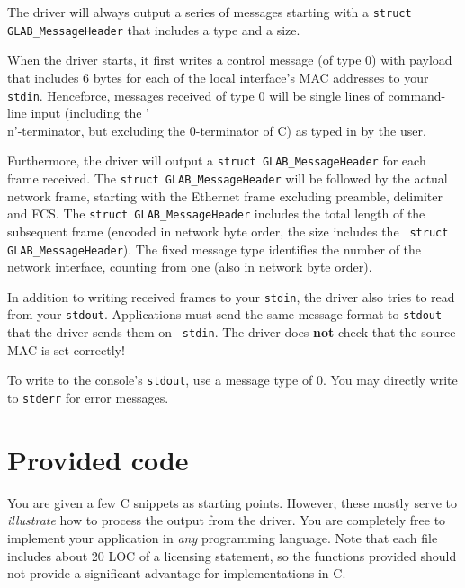 \documentclass{article}
\begin{document}
The driver will always output a series of messages starting with
a {\tt struct GLAB\_MessageHeader} that includes a type and a size.

When the driver starts, it first writes a control message (of type 0)
with payload that includes 6 bytes for each of the local interface's
MAC addresses to your {\tt stdin}.  Henceforce, messages received
of type 0 will be single lines of command-line input (including the
'\\n'-terminator, but excluding the 0-terminator of C) as typed in
by the user.

Furthermore, the driver will output a {\tt struct GLAB\_MessageHeader}
for each frame received.  The {\tt struct GLAB\_MessageHeader} will be
followed by the actual network frame, starting with the Ethernet frame
excluding preamble, delimiter and FCS.  The {\tt struct
  GLAB\_MessageHeader} includes the total length of the subsequent
frame (encoded in network byte order, the size includes the {\tt
  struct GLAB\_MessageHeader}).  The fixed message type identifies the
number of the network interface, counting from one (also in network
byte order).

In addition to writing received frames to your {\tt stdin}, the driver
also tries to read from your {\tt stdout}.  Applications must send the
same message format to {\tt stdout} that the driver sends them on {\tt
  stdin}.  The driver does {\bf not} check that the source MAC is set
correctly!

To write to the console's {\tt stdout}, use a message type of 0.
You may directly write to {\tt stderr} for error messages.


\section{Provided code}

You are given a few C snippets as starting points. However, these
mostly serve to {\em illustrate} how to process the output from the
driver. You are completely free to implement your application in {\em
  any} programming language.  Note that each file includes about 20
LOC of a licensing statement, so the functions provided should not
provide a significant advantage for implementations in C.
\end{document}
